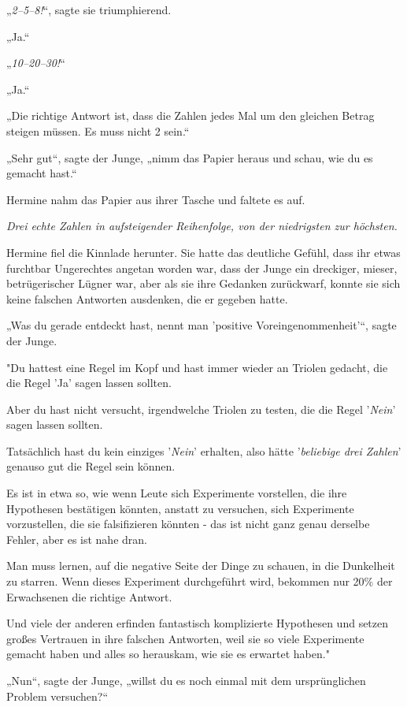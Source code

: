 {„\emph{2–5–8!}“, sagte sie triumphierend.

„Ja.“

„\emph{10–20–30!}“

„Ja.“

„Die richtige Antwort ist, dass die Zahlen jedes Mal um den gleichen Betrag steigen müssen. Es muss nicht 2 sein.“

„Sehr gut“, sagte der Junge, „nimm das Papier heraus und schau, wie du es gemacht hast.“

Hermine nahm das Papier aus ihrer Tasche und faltete es auf.

\emph{Drei echte Zahlen in aufsteigender Reihenfolge, von der niedrigsten zur höchsten.}

Hermine fiel die Kinnlade herunter. Sie hatte das deutliche Gefühl, dass ihr etwas furchtbar Ungerechtes angetan worden war, dass der Junge ein dreckiger, mieser, betrügerischer Lügner war, aber als sie ihre Gedanken zurückwarf, konnte sie sich keine falschen Antworten ausdenken, die er gegeben hatte.

„Was du gerade entdeckt hast, nennt man 'positive Voreingenommenheit'“, sagte der Junge.

"Du hattest eine Regel im Kopf und hast immer wieder an Triolen gedacht, die die Regel 'Ja' sagen lassen sollten.

Aber du hast nicht versucht, irgendwelche Triolen zu testen, die die Regel '\emph{Nein}' sagen lassen sollten.

Tatsächlich hast du kein einziges '\emph{Nein}' erhalten, also hätte '\emph{beliebige drei Zahlen}' genauso gut die Regel sein können.

Es ist in etwa so, wie wenn Leute sich Experimente vorstellen, die ihre Hypothesen bestätigen könnten, anstatt zu versuchen, sich Experimente vorzustellen, die sie falsifizieren könnten - das ist nicht ganz genau derselbe Fehler, aber es ist nahe dran.

Man muss lernen, auf die negative Seite der Dinge zu schauen, in die Dunkelheit zu starren. Wenn dieses Experiment durchgeführt wird, bekommen nur 20\% der Erwachsenen die richtige Antwort.

Und viele der anderen erfinden fantastisch komplizierte Hypothesen und setzen großes Vertrauen in ihre falschen Antworten, weil sie so viele Experimente gemacht haben und alles so herauskam, wie sie es erwartet haben."

„Nun“, sagte der Junge, „willst du es noch einmal mit dem ursprünglichen Problem versuchen?“

}

